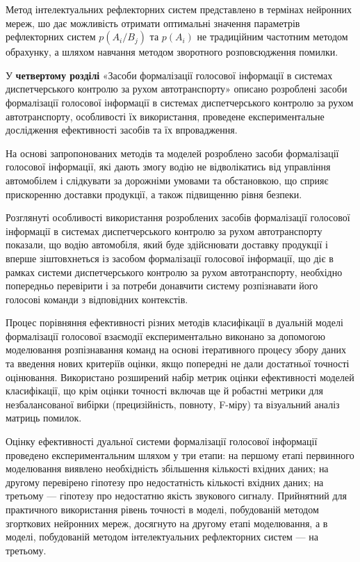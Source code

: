 Метод інтелектуальних рефлекторних систем представлено в термінах нейронних мереж, шо дає можливість отримати оптимальні значення параметрів рефлекторних систем $p(A_i/B_j)$ та $p(A_i)$ не традиційним частотним методом обрахунку, а шляхом навчання методом зворотного розповсюдження помилки.

У \textbf{четвертому розділі} «Засоби формалізації голосової інформації в системах диспетчерського контролю за рухом автотранспорту» описано розроблені засоби формалізації голосової інформації в системах диспетчерського контролю за рухом автотранспорту, особливості їх використання, проведене експериментальне дослідження ефективності засобів та їх впровадження.

На основі запропонованих методів та моделей розроблено засоби формалізації голосової інформації, які дають змогу водію не відволікатись від управління автомобілем і слідкувати за дорожніми умовами та обстановкою, що сприяє прискоренню доставки продукції, а також підвищенню рівня безпеки.

Розглянуті особливості використання розроблених засобів формалізації голосової інформації в системах диспетчерського контролю за рухом автотранспорту показали, що водію автомобіля, який буде здійснювати доставку продукції і вперше зіштовхнеться із засобом формалізації голосової інформації, що діє в рамках системи диспетчерського контролю за рухом автотранспорту, необхідно попередньо перевірити і за потреби донавчити систему розпізнавати його голосові команди з відповідних контекстів.

Процес порівняння ефективності різних методів класифікації в дуальній моделі формалізації голосової взаємодії експериментально виконано за допомогою моделювання розпізнавання команд на основі ітеративного процесу збору даних та введення нових критеріїв оцінки, якщо попередні не дали достатньої точності оцінювання.
Використано розширений набір метрик оцінки ефективності моделей класифікації, що крім оцінки точності включав ще й робастні метрики для незбалансованої вибірки (прецизійність, повноту, F-міру) та візуальний аналіз матриць помилок.

Оцінку ефективності дуальної системи формалізації голосової інформації проведено експериментальним шляхом у три етапи: на першому етапі первинного моделювання виявлено необхідність збільшення кількості вхідних даних; на другому перевірено гіпотезу про недостатність кількості вхідних даних; на третьому --- гіпотезу про недостатню якість звукового сигналу. Прийнятний для практичного використання рівень точності в моделі, побудованій методом згорткових нейронних мереж, досягнуто на другому етапі моделювання, а в моделі, побудованій методом інтелектуальних рефлекторних систем --- на третьому.

